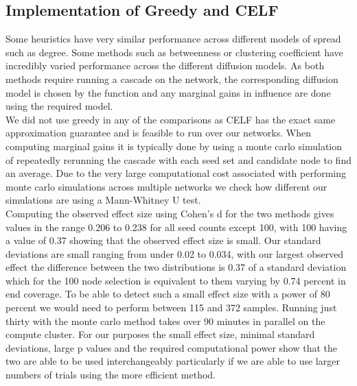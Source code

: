 \documentclass{article}
\begin{document}
\subsection{Implementation of Greedy and CELF}
Some heuristics have very similar performance across different models of spread such as degree.
Some methods such as betweenness or clustering coefficient have incredibly varied performance across the different diffusion models.
As both methods require running a cascade on the network, the corresponding diffusion model is chosen by the function and any marginal gains in influence are done using the required model.
\\

We did not use greedy in any of the comparisons as CELF has the exact same approximation guarantee and is feasible to run over our networks.
When computing marginal gains it is typically done by using a monte carlo simulation of repeatedly rerunning the cascade with each seed set and candidate node to find an average.
Due to the very large computational cost associated with performing monte carlo simulations across multiple networks we check how different our simulations are using a Mann-Whitney U test.
\\

Computing the observed effect size using Cohen's d for the two methods gives values in the range 0.206 to 0.238 for all seed counts except 100, with 100 having a value of 0.37 showing that the observed effect size is small.
Our standard deviations are small ranging from under 0.02 to 0.034, with our largest observed effect the difference between the two distributions is 0.37 of a standard deviation which for the 100 node selection is equivalent to them varying by 0.74 percent in end coverage.
To be able to detect such a small effect size with a power of 80 percent we would need to perform between 115 and 372 samples.
Running just thirty with the monte carlo method takes over 90 minutes in parallel on the compute cluster.
For our purposes the small effect size, minimal standard deviations, large p values and the required computational power show that the two are able to be used interchangeably particularly if we are able to use larger numbers of trials using the more efficient method.
\end{document}
